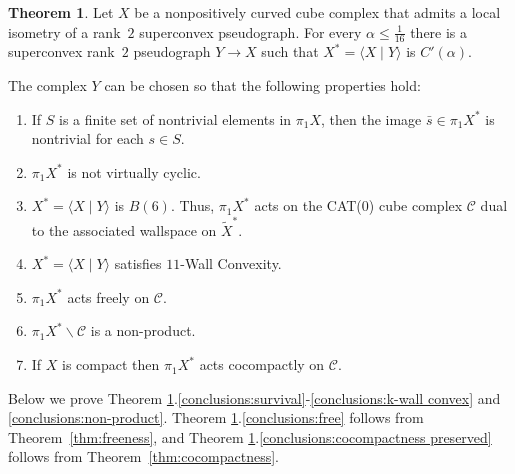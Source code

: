 \documentclass[12pt,oneside]{amsart}
\theoremstyle{definition}
\newtheorem{theorem}[thm]{Theorem}
\theoremstyle{definition}
\theoremstyle{remark}
\begin{document}
\begin{theorem}\label{thm:main with all properties}
        Let $X$ be a nonpositively curved cube complex that admits a local isometry of a rank~$2$ superconvex pseudograph. %
        For every $\alpha\leq \frac 1 {16}$ there is a superconvex rank~$2$ pseudograph $Y\to X$ such that $X^* = \langle X\mid Y\rangle$ is $C'(\alpha)$.

        The complex $Y$ can be chosen so that the following properties hold:
    \begin{enumerate}
     
        
        \item\label{conclusions:survival}
        If $S$ is a finite set of nontrivial elements in  $\pi_1X$, then the image $\bar s \in \pi_1X^*$ is nontrivial for each $s \in S$.


        \item\label{conclusions:non-elementary} $\pi_1X^*$ is not virtually cyclic.

        \item\label{conclusions:B6} $X^*=\langle X\mid Y\rangle$ is  $B(6)$. Thus, $\pi_1 X^*$ acts on the CAT(0) cube complex $\mathcal{C}$ dual to the associated wallspace  on $\widetilde X^*$.

        \item\label{conclusions:k-wall convex} $X^*=\langle X\mid Y\rangle$ satisfies $11$-Wall Convexity. 
        

        \item\label{conclusions:free} $\pi_1 X^*$ acts freely  on $\mathcal{C}$.

        \item\label{conclusions:non-product} $\pi_1X^*\backslash\mathcal C$ is a non-product.
        
        \item\label{conclusions:cocompactness preserved} If $X$ is compact then $\pi_1 X^*$ acts cocompactly  on $\mathcal{C}$.      
        
    \end{enumerate}
\end{theorem}


Below we prove Theorem \ref{thm:main with all properties}.\eqref{conclusions:survival}-\eqref{conclusions:k-wall convex} and \eqref{conclusions:non-product}. 
Theorem \ref{thm:main with all properties}.\eqref{conclusions:free} follows from Theorem~\ref{thm:freeness}, and Theorem \ref{thm:main with all properties}.\eqref{conclusions:cocompactness preserved} follows from Theorem~\ref{thm:cocompactness}.
\end{document}
